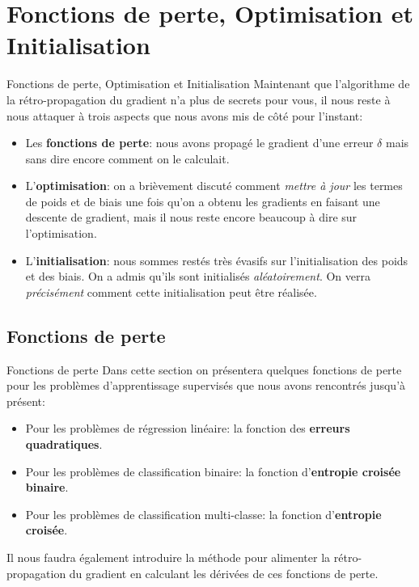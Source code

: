 \section[Fonctions de perte, Optimisation et Initialisation]{Fonctions de perte, Optimisation et Initialisation}

\begin{frame}{Fonctions de perte, Optimisation et Initialisation}
	Maintenant que l'algorithme de la rétro-propagation du gradient n'a plus de secrets pour vous, il nous reste à nous attaquer à trois aspects que nous avons mis de côté pour l'instant:
	
	\begin{itemize}
		\item Les \textbf{fonctions de perte}: nous avons propagé le gradient d'une erreur $\delta$ mais sans dire encore comment on le calculait.
		\pause
		\item L'\textbf{optimisation}: on a brièvement discuté comment \textit{mettre à jour} les termes de poids et de biais une fois qu'on a obtenu les gradients en faisant une descente de gradient, mais il nous reste encore beaucoup à dire sur l'optimisation.
		\pause
		\item L'\textbf{initialisation}: nous sommes restés très évasifs sur l'initialisation des poids et des biais. On a admis qu'ils sont initialisés \textit{aléatoirement}. On verra \textit{précisément} comment cette initialisation peut être réalisée.
	\end{itemize}
\end{frame}

\subsection[Fonctions de perte]{Fonctions de perte}

\begin{frame}{Fonctions de perte}
	Dans cette section on présentera quelques fonctions de perte pour les problèmes d'apprentissage supervisés que nous avons rencontrés jusqu'à présent:
	\begin{itemize}
		\item Pour les problèmes de régression linéaire: la fonction des \textbf{erreurs quadratiques}.
		\item Pour les problèmes de classification binaire: la fonction d'\textbf{entropie croisée binaire}.
		\item Pour les problèmes de classification multi-classe: la fonction d'\textbf{entropie croisée}.
	\end{itemize}
	Il nous faudra également introduire la méthode pour alimenter la rétro-propagation du gradient en calculant les dérivées de ces fonctions de perte.
\end{frame}

